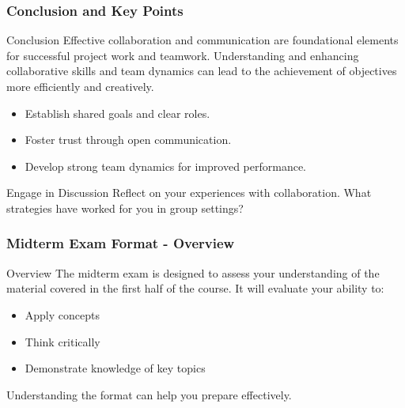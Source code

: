 \documentclass[aspectratio=169]{beamer}
\begin{document}
\begin{frame}[fragile]
    \frametitle{Conclusion and Key Points}
    \begin{block}{Conclusion}
        Effective collaboration and communication are foundational elements for successful project work and teamwork. Understanding and enhancing collaborative skills and team dynamics can lead to the achievement of objectives more efficiently and creatively.
    \end{block}

    \begin{itemize}
        \item Establish shared goals and clear roles.
        \item Foster trust through open communication.
        \item Develop strong team dynamics for improved performance.
    \end{itemize}

    \begin{block}{Engage in Discussion}
        Reflect on your experiences with collaboration. What strategies have worked for you in group settings?
    \end{block}
\end{frame}

\begin{frame}[fragile]
    \frametitle{Midterm Exam Format - Overview}
    \begin{block}{Overview}
        The midterm exam is designed to assess your understanding of the material covered in the first half of the course. 
        It will evaluate your ability to:
        \begin{itemize}
            \item Apply concepts
            \item Think critically
            \item Demonstrate knowledge of key topics
        \end{itemize}
        Understanding the format can help you prepare effectively.
    \end{block}
\end{frame}
\end{document}
